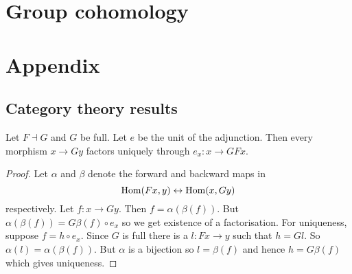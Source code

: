 \documentclass{memoir}
\begin{document}
\chapter{Group cohomology}

\chapter{Appendix}
\section{Category theory results}
\begin{proposition}
    \label{prop:cat_factor}
    Let $F\dashv G$ and $G$ be full.
    Let $e$ be the unit of the adjunction.
    Then every morphism $x\to Gy$ factors uniquely through $e_x:x\to GFx$.
\end{proposition}
\begin{proof}
    Let $\alpha$ and $\beta$ denote the forward and backward maps in
    \begin{equation}
        \operatorname{Hom}(Fx,y) \leftrightarrow \operatorname{Hom}(x,Gy)
    \end{equation}
    respectively.
    Let $f:x\to Gy$.
    Then $f = \alpha(\beta(f))$.
    But $\alpha(\beta(f)) = G\beta(f)\circ e_x$ so we get existence of a factorisation.
    For uniqueness, suppose $f = h\circ e_x$.
    Since $G$ is full there is a $l:Fx\to y$ such that $h = Gl$.
    So $\alpha(l) = \alpha(\beta(f))$.
    But $\alpha$ is a bijection so $l = \beta(f)$ and hence $h = G\beta(f)$ which gives uniqueness.
\end{proof}
\end{document}
